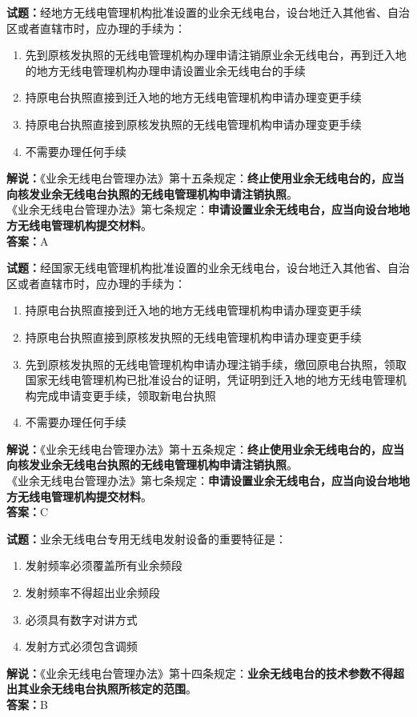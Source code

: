 \documentclass{ctexbook}
\begin{document}
\bigskip


\noindent\textbf{试题：}经地方无线电管理机构批准设置的业余无线电台，设台地迁入其他省、自治区或者直辖市时，应办理的手续为：
\begin{enumerate}[leftmargin=3em]
	\item 先到原核发执照的无线电管理机构办理申请注销原业余无线电台，再到迁入地的地方无线电管理机构办理申请设置业余无线电台的手续
	\item 持原电台执照直接到迁入地的地方无线电管理机构申请办理变更手续
	\item 持原电台执照直接到原核发执照的无线电管理机构申请办理变更手续
	\item 不需要办理任何手续
\end{enumerate}
\noindent\textbf{解说：}《业余无线电台管理办法》第十五条规定：\textbf{终止使用业余无线电台的，应当向核发业余无线电台执照的无线电管理机构申请注销执照}。\\
《业余无线电台管理办法》第七条规定：\textbf{申请设置业余无线电台，应当向设台地地方无线电管理机构提交材料}。\\\noindent\textbf{答案：}A%


\bigskip


\noindent\textbf{试题：}经国家无线电管理机构批准设置的业余无线电台，设台地迁入其他省、自治区或者直辖市时，应办理的手续为：
\begin{enumerate}[leftmargin=3em]
	\item 持原电台执照直接到迁入地的地方无线电管理机构申请办理变更手续
	\item 持原电台执照直接到原核发执照的无线电管理机构申请办理变更手续
	\item 先到原核发执照的无线电管理机构申请办理注销手续，缴回原电台执照，领取国家无线电管理机构已批准设台的证明，凭证明到迁入地的地方无线电管理机构完成申请变更手续，领取新电台执照
	\item 不需要办理任何手续
\end{enumerate}
\noindent\textbf{解说：}《业余无线电台管理办法》第十五条规定：\textbf{终止使用业余无线电台的，应当向核发业余无线电台执照的无线电管理机构申请注销执照}。\\
《业余无线电台管理办法》第七条规定：\textbf{申请设置业余无线电台，应当向设台地地方无线电管理机构提交材料}。\\\noindent\textbf{答案：}C%



\bigskip


\noindent\textbf{试题：}业余无线电台专用无线电发射设备的重要特征是：
\begin{enumerate}[leftmargin=3em]
	\item 发射频率必须覆盖所有业余频段
	\item 发射频率不得超出业余频段
	\item 必须具有数字对讲方式
	\item 发射方式必须包含调频
\end{enumerate}
\noindent\textbf{解说：}《业余无线电台管理办法》第十四条规定：\textbf{业余无线电台的技术参数不得超出其业余无线电台执照所核定的范围}。\\\noindent\textbf{答案：}B%
\end{document}
